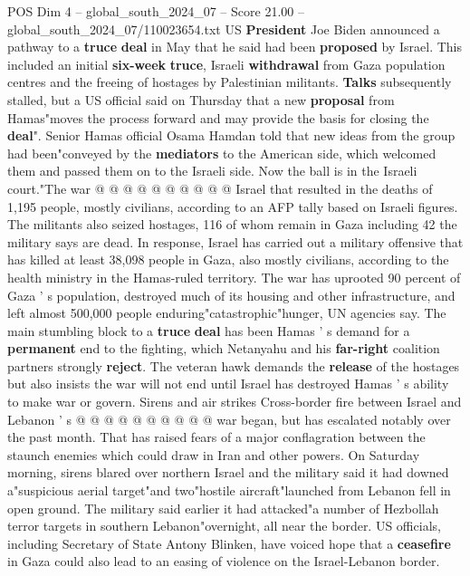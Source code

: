 \begin{textsample}{POS Dim 4 – global\_south\_2024\_07 – Score 21.00 – global\_south\_2024\_07/110023654.txt}
US \textbf{President} Joe Biden announced a pathway to a \textbf{truce} \textbf{deal} in May that he said had been \textbf{proposed} by Israel.
This included an initial \textbf{six-week} \textbf{truce}, Israeli \textbf{withdrawal} from Gaza population centres and the freeing of hostages by Palestinian militants. \textbf{Talks} subsequently stalled, but a US official said on Thursday that a new \textbf{proposal} from Hamas"moves the process forward and may provide the basis for closing the \textbf{deal}".
Senior Hamas official Osama Hamdan told that new ideas from the group had been"conveyed by the \textbf{mediators} to the American side, which welcomed them and passed them on to the Israeli side.
Now the ball is in the Israeli court."The war @ @ @ @ @ @ @ @ @ @ Israel that resulted in the deaths of 1,195 people, mostly civilians, according to an AFP tally based on Israeli figures.
The militants also seized hostages, 116 of whom remain in Gaza including 42 the military says are dead.
In response, Israel has carried out a military offensive that has killed at least 38,098 people in Gaza, also mostly civilians, according to the health ministry in the Hamas-ruled territory.
The war has uprooted 90 percent of Gaza ' s population, destroyed much of its housing and other infrastructure, and left almost 500,000 people enduring"catastrophic"hunger, UN agencies say.
The main stumbling block to a \textbf{truce} \textbf{deal} has been Hamas ' s demand for a \textbf{permanent} end to the fighting, which Netanyahu and his \textbf{far-right} coalition partners strongly \textbf{reject}.
The veteran hawk demands the \textbf{release} of the hostages but also insists the war will not end until Israel has destroyed Hamas ' s ability to make war or govern.
Sirens and air strikes Cross-border fire between Israel and Lebanon ' s @ @ @ @ @ @ @ @ @ @ war began, but has escalated notably over the past month.
That has raised fears of a major conflagration between the staunch enemies which could draw in Iran and other powers.
On Saturday morning, sirens blared over northern Israel and the military said it had downed a"suspicious aerial target"and two"hostile aircraft"launched from Lebanon fell in open ground.
The military said earlier it had attacked"a number of Hezbollah terror targets in southern Lebanon"overnight, all near the border.
US officials, including Secretary of State Antony Blinken, have voiced hope that a \textbf{ceasefire} in Gaza could also lead to an easing of violence on the Israel-Lebanon border.

\end{textsample}
